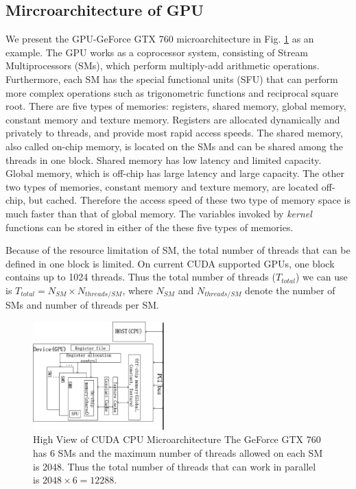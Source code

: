 \documentclass[letterpaper, 10pt, conference,twoside]{ieeeconf}
\begin{document}
\subsection{Mircroarchitecture of GPU} 
We present the GPU-GeForce GTX 760 microarchitecture in Fig. \ref{figure2} as an example. The GPU works as a coprocessor system, consisting of Stream Multiprocessors (SMs), which perform multiply-add arithmetic operations. Furthermore, each SM has the special functional units (SFU) that can perform more complex operations such as trigonometric functions and reciprocal square root. There are five types of memories: registers, shared memory, global memory, constant memory and texture memory. Registers are allocated dynamically and privately to threads, and provide most rapid access speeds. The shared memory, also called on-chip memory, is located on the SMs and can be shared among the threads in one block. Shared memory has low latency and limited capacity. Global memory, which is off-chip has large latency and large capacity. The other two types of memories, constant memory and texture memory, are located off-chip, but cached. Therefore the access speed of these two type of memory space is much faster than that of global memory. The variables invoked by \textit{kernel} functions can be stored in either of the these five types of memories.

Because of the resource limitation of SM, the total number of threads that can be defined in one block is limited. On current CUDA supported GPUs, one block contains up to 1024 threads. Thus the total number of threads ($T_{total}$) we can use is $T_{total}=N_{SM}\times N_{threads/SM} $, where $N_{SM}$ and $N_{threads/SM}$ denote the number of SMs and number of threads per SM.  
\begin{figure}[htb]
\centering
\includegraphics[width=0.45\textwidth]{High_view_of_CUDA_GPU_microarchitecture.eps}
\caption{ High View of CUDA CPU Microarchitecture
The GeForce GTX 760 has 6 SMs and the maximum number of threads allowed on each SM is 2048. Thus the total number of threads that can work in parallel is $2048\times 6=12288$.
}
\label{figure2}
\end{figure}   
\end{document}
